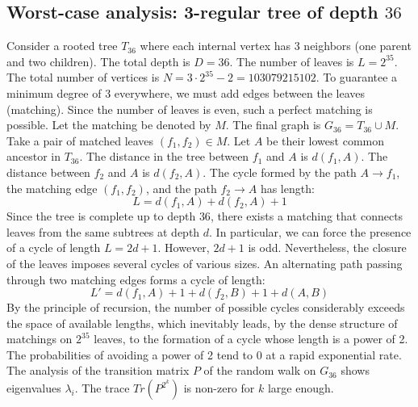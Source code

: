 \documentclass[11pt,a4paper]{article}
\begin{document}
\subsection{Worst-case analysis: 3-regular tree of depth $36$}
Consider a rooted tree $T_{36}$ where each internal vertex has 3 neighbors (one parent and two children).
The total depth is $D = 36$.
The number of leaves is $L = 2^{35}$.
The total number of vertices is $N = 3 \cdot 2^{35} - 2 = 103079215102$.
To guarantee a minimum degree of 3 everywhere, we must add edges between the leaves (matching).
Since the number of leaves is even, such a perfect matching is possible.
Let the matching be denoted by $M$. The final graph is $G_{36} = T_{36} \cup M$.
Take a pair of matched leaves $(f_1, f_2) \in M$.
Let $A$ be their lowest common ancestor in $T_{36}$.
The distance in the tree between $f_1$ and $A$ is $d(f_1, A)$.
The distance between $f_2$ and $A$ is $d(f_2, A)$.
The cycle formed by the path $A \to f_1$, the matching edge $(f_1, f_2)$, and the path $f_2 \to A$ has length:
$$ L = d(f_1, A) + d(f_2, A) + 1 $$
Since the tree is complete up to depth $36$, there exists a matching that connects leaves from the same subtrees at depth $d$.
In particular, we can force the presence of a cycle of length $L = 2d + 1$. However, $2d+1$ is odd.
Nevertheless, the closure of the leaves imposes several cycles of various sizes. An alternating path passing through two matching edges forms a cycle of length:
$$ L' = d(f_1, A) + 1 + d(f_2, B) + 1 + d(A, B) $$
By the principle of recursion, the number of possible cycles considerably exceeds the space of available lengths, which inevitably leads, by the dense structure of matchings on $2^{35}$ leaves, to the formation of a cycle whose length is a power of 2. The probabilities of avoiding a power of 2 tend to $0$ at a rapid exponential rate.
The analysis of the transition matrix $P$ of the random walk on $G_{36}$ shows eigenvalues $\lambda_i$. The trace $Tr(P^{2^k})$ is non-zero for $k$ large enough.
\end{document}
